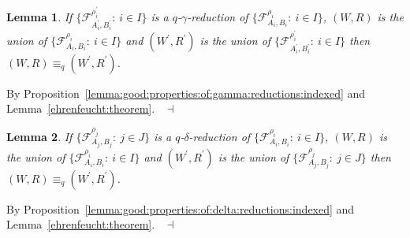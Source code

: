 \documentclass[draft]{article}
\newtheorem{lemma}{Lemma}
\newenvironment{proof}{{\bf Proof:}}{~$\dashv$\\}
\begin{document}
\begin{lemma}\label{lemma:gamma:reduction:fol}
%
%
If $\{{\mathcal F}_{A_{i}^{\prime},B_{i}^{\prime}}^{\rho_{i}^{\prime}}:\ i{\in}I\}$ is a $q$-$\gamma$-reduction of $\{{\mathcal F}_{A_{i},B_{i}}^{\rho_{i}}:\ i{\in}I\}$, $(W,R)$ is the union of $\{{\mathcal F}_{A_{i},B_{i}}^{\rho_{i}}:\ i{\in}I\}$ and $(W^{\prime},R^{\prime})$ is the union of $\{{\mathcal F}_{A_{i}^{\prime},B_{i}^{\prime}}^{\rho_{i}^{\prime}}:\ i{\in}I\}$ then $(W,R){\equiv_{q}}(W^{\prime},R^{\prime})$.
%
%
\end{lemma}
%
%
\begin{proof}
%
%
By Proposition~\ref{lemma:good:properties:of:gamma:reductions:indexed} and Lemma~\ref{ehrenfeucht:theorem}.
%
%
\medskip
%
%
\end{proof}
%
%
\begin{lemma}\label{lemma:delta:reduction:fol}
%
%
If $\{{\mathcal F}_{A_{j},B_{j}}^{\rho_{j}}:\ j{\in}J\}$ is a $q$-$\delta$-reduction of $\{{\mathcal F}_{A_{i},B_{i}}^{\rho_{i}}:\ i{\in}I\}$, $(W,R)$ is the union of $\{{\mathcal F}_{A_{i},B_{i}}^{\rho_{i}}:\ i{\in}I\}$ and $(W^{\prime},R^{\prime})$ is the union of $\{{\mathcal F}_{A_{j},B_{j}}^{\rho_{j}}:\ j{\in}J\}$ then $(W,R){\equiv_{q}}(W^{\prime},R^{\prime})$.
%
%
\end{lemma}
%
%
\begin{proof}
%
%
By Proposition~\ref{lemma:good:properties:of:delta:reductions:indexed} and Lemma~\ref{ehrenfeucht:theorem}.
%
%
\medskip
%
%
\end{proof}
%
%
%
%
\end{document}
